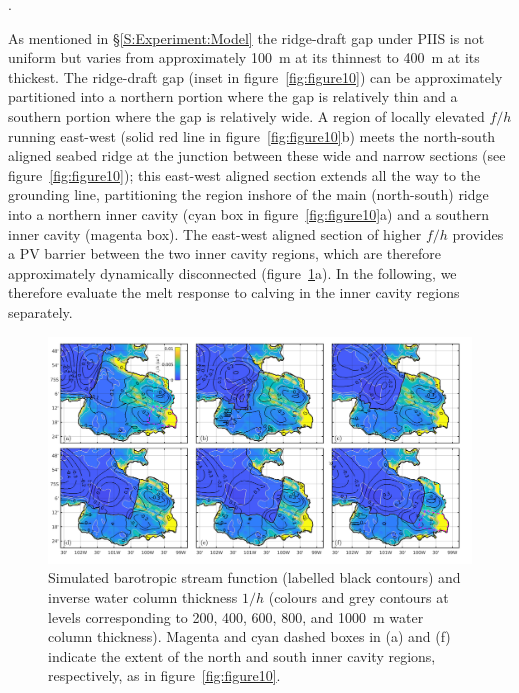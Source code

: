 \documentclass[draft]{agujournal2019}
\begin{document}
. %

As mentioned in \S\ref{S:Experiment:Model} the ridge-draft gap under PIIS is not uniform but varies from approximately 100~m at its thinnest to 400~m at its thickest.  The ridge-draft gap (inset in figure~\ref{fig:figure10}) can be approximately partitioned into a northern portion where the gap is relatively thin and a southern portion where the gap is relatively wide. A region of locally elevated $f/h$ running east-west (solid red line in figure~\ref{fig:figure10}b) meets the north-south aligned seabed ridge at the junction between these wide and narrow sections (see figure~\ref{fig:figure10}); this east-west aligned section extends all the way to the grounding line, partitioning the region inshore of the main (north-south) ridge into a northern inner cavity (cyan box in figure~\ref{fig:figure10}a) and a southern inner cavity (magenta box). The east-west aligned section of higher $f/h$  provides a PV barrier between the two inner cavity regions, which are therefore approximately dynamically disconnected (figure~\ref{fig:figure11}a). In the following, we therefore evaluate the melt response to calving in the inner cavity regions separately.

\begin{figure}
    \centering
    \includegraphics[width = \textwidth]{../make_figures/plots/figure11.pdf}
    \caption{Simulated barotropic stream function (labelled black contours) and inverse water column thickness $1/h$ (colours and grey contours at levels corresponding to 200, 400, 600, 800, and 1000~m water column thickness). Magenta and cyan dashed boxes in (a) and (f) indicate the extent of the north and south inner cavity regions, respectively, as in figure~\ref{fig:figure10}.} 
    \label{fig:figure11}
\end{figure}
\end{document}
